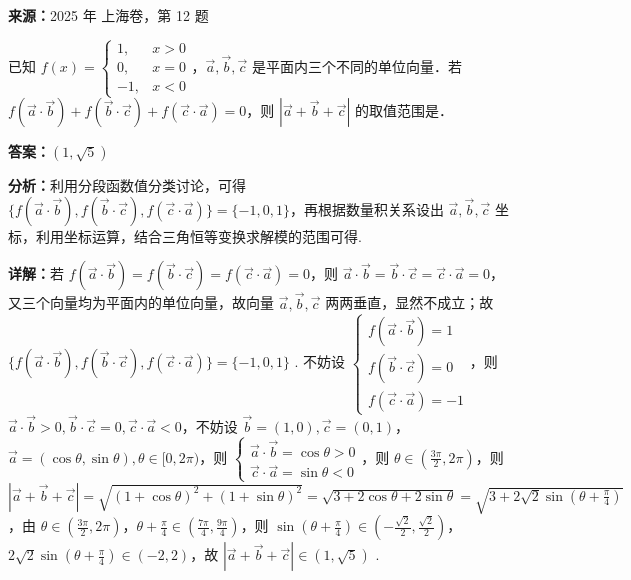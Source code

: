 \begin{question}[points=5]
\textbf{来源：}2025 年 上海卷，第 12 题\par
已知 $f(x) = \begin{cases} 1, & x > 0 \\ 0, & x = 0 \\ -1, & x < 0 \end{cases}$，$\vec{a}, \vec{b}, \vec{c}$ 是平面内三个不同的单位向量．若 $f(\vec{a} \cdot \vec{b}) + f(\vec{b} \cdot \vec{c}) + f(\vec{c} \cdot \vec{a}) = 0$，则 $|\vec{a} + \vec{b} + \vec{c}|$ 的取值范围是．
\fillin[{$(1, \sqrt{5})$}]
\begin{solution}
\textbf{答案：}$(1, \sqrt{5})$

\textbf{分析：}利用分段函数值分类讨论，可得 $\{f(\vec{a} \cdot \vec{b}), f(\vec{b} \cdot \vec{c}), f(\vec{c} \cdot \vec{a})\} = \{-1, 0, 1\}$，再根据数量积关系设出 $\vec{a}, \vec{b}, \vec{c}$ 坐标，利用坐标运算，结合三角恒等变换求解模的范围可得.

\textbf{详解：}若 $f(\vec{a} \cdot \vec{b}) = f(\vec{b} \cdot \vec{c}) = f(\vec{c} \cdot \vec{a}) = 0$，则 $\vec{a} \cdot \vec{b} = \vec{b} \cdot \vec{c} = \vec{c} \cdot \vec{a} = 0$，又三个向量均为平面内的单位向量，故向量 $\vec{a}, \vec{b}, \vec{c}$ 两两垂直，显然不成立；故 $\{f(\vec{a} \cdot \vec{b}), f(\vec{b} \cdot \vec{c}), f(\vec{c} \cdot \vec{a})\} = \{-1, 0, 1\}$ . 不妨设 $\begin{cases} f(\vec{a} \cdot \vec{b}) = 1 \\ f(\vec{b} \cdot \vec{c}) = 0 \\ f(\vec{c} \cdot \vec{a}) = -1 \end{cases}$，则 $\vec{a} \cdot \vec{b} > 0, \vec{b} \cdot \vec{c} = 0, \vec{c} \cdot \vec{a} < 0$，不妨设 $\vec{b} = (1,0), \vec{c} = (0,1)$，$\vec{a} = (\cos \theta, \sin \theta), \theta \in [0, 2\pi)$，则 $\begin{cases} \vec{a} \cdot \vec{b} = \cos \theta > 0 \\ \vec{c} \cdot \vec{a} = \sin \theta < 0 \end{cases}$，则 $\theta \in \left(\frac{3\pi}{2}, 2\pi\right)$，则 $|\vec{a} + \vec{b} + \vec{c}| = \sqrt{(1+\cos \theta)^2 + (1+\sin \theta)^2} = \sqrt{3 + 2\cos \theta + 2\sin \theta} = \sqrt{3 + 2\sqrt{2}\sin\left(\theta + \frac{\pi}{4}\right)}$，由 $\theta \in \left(\frac{3\pi}{2}, 2\pi\right)$，$\theta + \frac{\pi}{4} \in \left(\frac{7\pi}{4}, \frac{9\pi}{4}\right)$，则 $\sin\left(\theta + \frac{\pi}{4}\right) \in \left(-\frac{\sqrt{2}}{2}, \frac{\sqrt{2}}{2}\right)$，$2\sqrt{2}\sin\left(\theta + \frac{\pi}{4}\right) \in (-2, 2)$，故 $|\vec{a} + \vec{b} + \vec{c}| \in (1, \sqrt{5})$ .
\end{solution}
\end{question}

